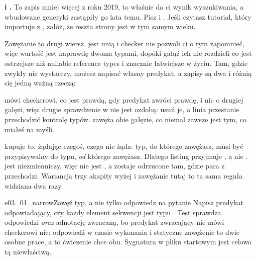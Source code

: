 \begin{trapbox}
\textbf{ i .} To zapis mniej więcej z
roku 2019, to właśnie da ci wynik wyszukiwania, a wbudowane generyki
zastąpiły go lata temu. Pisz  i . Jeśli
czytasz tutorial, który importuje  z , załóż, że reszta
strony jest w tym samym wieku.
\end{trapbox}

Zawężanie to drugi wiersz.  jest unią i checker nie pozwoli
ci o tym zapomnieć, więc wartość jest naprawdę dwoma typami, dopóki gałąź
ich nie rozdzieli \dash{} co jest ostrzejsze niż nullable reference types i
znacznie łatwiejsze w życiu. Tam, gdzie zwykły  nie
wystarczy, możesz napisać własny predykat, a zapisy są dwa i różnią się
jedną ważną rzeczą:


\noindent
{} mówi checkerowi, co jest prawdą, gdy predykat zwróci prawdę,
i nic o drugiej gałęzi, więc drugie sprawdzenie w
 nie jest ozdobą: usuń je, a linia przestanie
przechodzić kontrolę typów.  zawęża obie gałęzie, co niemal
zawsze jest tym, co miałeś na myśli.

\begin{note}
 kupuje to, żądając czegoś, czego  nie żąda: typ,
do którego zawężasz, musi być przypisywalny do typu, \emph{od} którego
zawężasz. Dlatego listing przyjmuje , a nie .
 jest niezmienniczy, więc  nie jest
, a  zostaje
odrzucone tam, gdzie para z  przechodzi. Wariancja trzy
akapity wyżej i zawężanie tutaj to ta sama reguła widziana dwa razy.
\end{note}

\begin{exercise}{e03_01_narrow}{Zawęź typ, a nie tylko odpowiedz na pytanie}
Napisz predykat odpowiadający, czy każdy element sekwencji jest typu
. Test sprawdza odpowiedzi \emph{oraz} adnotację zwracaną, bo
predykat zwracający  nie mówi checkerowi nic: odpowiedź w czasie
wykonania i statyczne zawężenie to dwie osobne prace, a to ćwiczenie chce
obu. Sygnatura w pliku startowym jest celowo tą niewłaściwą.
\end{exercise}

